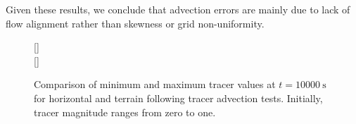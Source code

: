 Given these results, we conclude that advection errors are mainly due to lack of flow alignment rather than skewness or grid non-uniformity.

\begin{figure}
	\captionsetup[subfigure]{position=b}
	\centering
	[\textwidth]{} \\
	[\textwidth]{}
%
	\caption{Comparison of minimum and maximum tracer values at $t = \SI{10000}{\second}$ for horizontal and terrain following tracer advection tests.  Initially, tracer magnitude ranges from zero to one.}
	\label{fig:wobblyTracerAdvection:ranges}
\end{figure}

